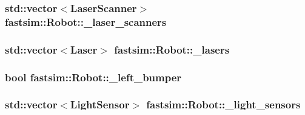 \subsubsection[{\texorpdfstring{\+\_\+laser\+\_\+scanners}{_laser_scanners}}]{\setlength{\rightskip}{0pt plus 5cm}std\+::vector$<${\bf Laser\+Scanner}$>$ fastsim\+::\+Robot\+::\+\_\+laser\+\_\+scanners\hspace{0.3cm}{\ttfamily [protected]}}\hypertarget{classfastsim_1_1_robot_a939bbd34745152e9e1d3afe2c9120f4d}{}\label{classfastsim_1_1_robot_a939bbd34745152e9e1d3afe2c9120f4d}
\subsubsection[{\texorpdfstring{\+\_\+lasers}{_lasers}}]{\setlength{\rightskip}{0pt plus 5cm}std\+::vector$<${\bf Laser}$>$ fastsim\+::\+Robot\+::\+\_\+lasers\hspace{0.3cm}{\ttfamily [protected]}}\hypertarget{classfastsim_1_1_robot_a4ace6b4e6c10e60d823aba7b2524649f}{}\label{classfastsim_1_1_robot_a4ace6b4e6c10e60d823aba7b2524649f}
\subsubsection[{\texorpdfstring{\+\_\+left\+\_\+bumper}{_left_bumper}}]{\setlength{\rightskip}{0pt plus 5cm}bool fastsim\+::\+Robot\+::\+\_\+left\+\_\+bumper\hspace{0.3cm}{\ttfamily [protected]}}\hypertarget{classfastsim_1_1_robot_a9bdb045ad740d8790aa053ccc8324694}{}\label{classfastsim_1_1_robot_a9bdb045ad740d8790aa053ccc8324694}
\subsubsection[{\texorpdfstring{\+\_\+light\+\_\+sensors}{_light_sensors}}]{\setlength{\rightskip}{0pt plus 5cm}std\+::vector$<${\bf Light\+Sensor}$>$ fastsim\+::\+Robot\+::\+\_\+light\+\_\+sensors\hspace{0.3cm}{\ttfamily [protected]}}\hypertarget{classfastsim_1_1_robot_a0998428cce1ba4cb37ae3c52b872fd92}{}\label{classfastsim_1_1_robot_a0998428cce1ba4cb37ae3c52b872fd92}

